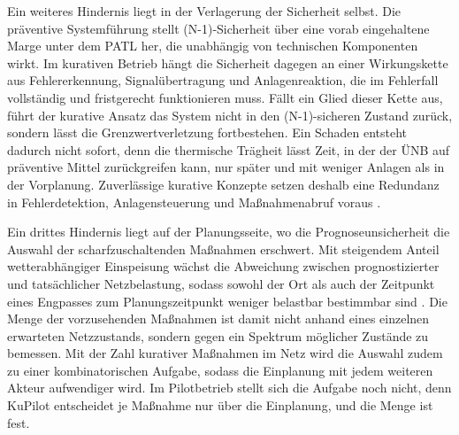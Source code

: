 Ein weiteres Hindernis liegt in der Verlagerung der Sicherheit selbst.
Die präventive Systemführung stellt (N-1)-Sicherheit über eine vorab eingehaltene Marge unter dem \ac{PATL} her, die unabhängig von technischen Komponenten wirkt.
Im kurativen Betrieb hängt die Sicherheit dagegen an einer Wirkungskette aus Fehlererkennung, Signalübertragung und Anlagenreaktion, die im Fehlerfall vollständig und fristgerecht funktionieren muss.
Fällt ein Glied dieser Kette aus, führt der kurative Ansatz das System nicht in den (N-1)-sicheren Zustand zurück, sondern lässt die Grenzwertverletzung fortbestehen.
Ein Schaden entsteht dadurch nicht sofort, denn die thermische Trägheit lässt Zeit, in der der \ac{ÜNB} auf präventive Mittel zurückgreifen kann, nur später und mit weniger Anlagen als in der Vorplanung.
Zuverlässige kurative Konzepte setzen deshalb eine Redundanz in Fehlerdetektion, Anlagensteuerung und Maßnahmenabruf voraus \cite{innosys_2030_gesamtverbund_innovationen_2021, sous_untersuchung_2022, sous_comparison_2025}.

Ein drittes Hindernis liegt auf der Planungsseite, wo die Prognoseunsicherheit die Auswahl der scharfzuschaltenden Maßnahmen erschwert.
Mit steigendem Anteil wetterabhängiger Einspeisung wächst die Abweichung zwischen prognostizierter und tatsächlicher Netzbelastung, sodass sowohl der Ort als auch der Zeitpunkt eines Engpasses zum Planungszeitpunkt weniger belastbar bestimmbar sind \cite{lindner_operation_2023, rystad_energy_renewables__power_analytics_energy_2026}.
Die Menge der vorzusehenden Maßnahmen ist damit nicht anhand eines einzelnen erwarteten Netzzustands, sondern gegen ein Spektrum möglicher Zustände zu bemessen.
Mit der Zahl kurativer Maßnahmen im Netz wird die Auswahl zudem zu einer kombinatorischen Aufgabe, sodass die Einplanung mit jedem weiteren Akteur aufwendiger wird.
Im Pilotbetrieb stellt sich die Aufgabe noch nicht, denn KuPilot entscheidet je Maßnahme nur über die Einplanung, und die Menge ist fest.

